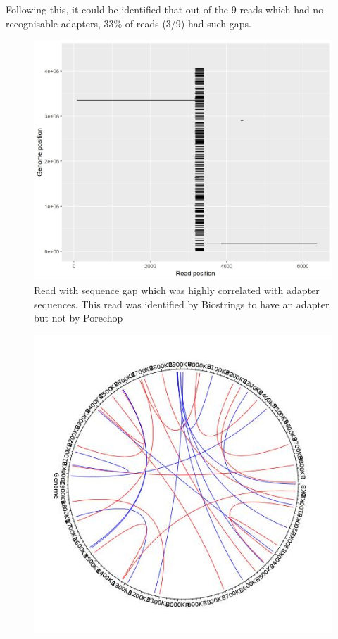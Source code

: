  Following this, it could be identified that out of the 9 reads which had no recognisable adapters, 33\%  of reads (3/9) had such gaps. 

\begin{figure}[h!]
\centering
\includegraphics[width=\textwidth{}]{Chapter_2/Blast_results_347395.jpeg}
\caption{ Read with sequence gap which was highly correlated with adapter sequences. This read was identified by Biostrings to have an adapter but not by Porechop}
\label{fig:UK54_new_basket}
\end{figure}



\begin{figure}[h!]
\centering
\includegraphics[width=\textwidth{}]{Chapter_2/UK54_new_basketball.jpeg}
\caption{  }
\label{fig:UK54_new_basket}
\end{figure}


